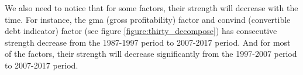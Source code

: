 We also need to notice that for some factors, their strength will decrease with the time.
For instance, the gma (gross profitability) factor and convind (convertible debt indicator) factor (see figure \ref{figure:thirty_decompose}) has consecutive strength decrease from the 1987-1997 period to 2007-2017 period.
And for most of the factors, their strength will decrease significantly from the 1997-2007 period to 2007-2017 period.







